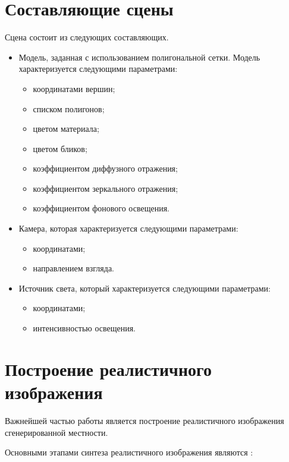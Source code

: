\section{Составляющие сцены}
Сцена состоит из следующих составляющих.

\begin{itemize}
	\item Модель, заданная с использованием полигональной сетки. Модель характеризуется следующими параметрами:
	\begin{itemize}
	    \item координатами вершин;
	    \item списком полигонов;
	    \item цветом материала;
	    \item цветом бликов;
	    \item коэффициентом диффузного отражения;
	    \item коэффициентом зеркального отражения;
	    \item коэффициентом фонового освещения.
	\end{itemize}
	\item Камера, которая характеризуется следующими параметрами:
	\begin{itemize}
	    \item координатами;
	    \item направлением взгляда.
	\end{itemize}
	\item Источник света, который характеризуется следующими параметрами:
	\begin{itemize}
	    \item координатами;
	    \item интенсивностью освещения.
	\end{itemize}
\end{itemize}

\section{Построение реалистичного изображения}
Важнейшей частью работы является построение реалистичного изображения сгенерированной местности. 

Основными этапами синтеза реалистичного изображения являются \cite{bib:7}:

